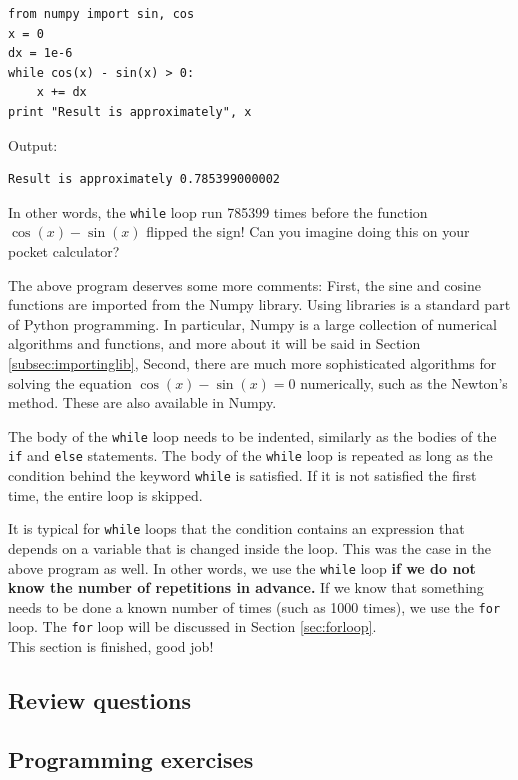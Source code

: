 \begin{verbatim}
from numpy import sin, cos
x = 0
dx = 1e-6
while cos(x) - sin(x) > 0:
    x += dx    
print "Result is approximately", x
\end{verbatim}
Output:

\begin{verbatim}
Result is approximately 0.785399000002
\end{verbatim}
In other words, the {\tt while} loop run 785399 times before 
the function $\cos(x) - \sin(x)$ flipped the sign! Can you 
imagine doing this on your pocket calculator?

The above program deserves some more comments: First, the sine and cosine 
functions are imported from the Numpy library. Using libraries 
is a standard part of Python programming. In particular, Numpy 
is a large collection of numerical algorithms and functions, and 
more about it will be said in Section \ref{subsec:importinglib},
Second, there are much more sophisticated algorithms for solving 
the equation $\cos(x) - \sin(x) = 0$ numerically, such as the Newton's 
method. These are also available in Numpy.

The body of the {\tt while} loop needs to be indented, similarly as
the bodies of the {\tt if} and {\tt else} statements. The body of
the {\tt while} loop
is repeated as long as the condition behind the keyword {\tt while}
is satisfied. If it is not satisfied the first time, the entire 
loop is skipped. 

It is typical for {\tt while} loops that the condition contains 
an expression that depends on a variable that is changed inside the 
loop. This was the case in the above program as well. In other 
words, we use the {\tt while} loop {\bf if we do not know the number of 
repetitions in advance.} If we know that something needs to be done
a known number of times (such as 1000 times), we use the {\tt for} loop.
The {\tt for} loop will be discussed in Section \ref{sec:forloop}.\\

\noindent
This section is finished, good job!

\subsection{Review questions}

\subsection{Programming exercises}


